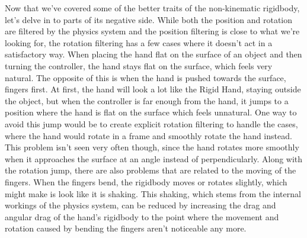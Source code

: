 Now that we've covered some of the better traits of the non-kinematic rigidbody, let's delve in to parts of its negative side. While both the position and rotation are filtered by the physics system and the position filtering is close to what we're looking for, the rotation filtering has a few cases where it doesn't act in a satisfactory way. When placing the hand flat on the surface of an object and then turning the controller, the hand stays flat on the surface, which feels very natural. The opposite of this is when the hand is pushed towards the surface, fingers first. At first, the hand will look a lot like the Rigid Hand, staying outside the object, but when the controller is far enough from the hand, it jumps to a position where the hand is flat on the surface which feels unnatural. One way to avoid this jump would be to create explicit rotation filtering to handle the cases, where the hand would rotate in a frame and smoothly rotate the hand instead. This problem isn't seen very often though, since the hand rotates more smoothly when it approaches the surface at an angle instead of perpendicularly. Along with the rotation jump, there are also problems that are related to the moving of the fingers. When the fingers bend, the rigidbody moves or rotates slightly, which might make is look like it is shaking. This shaking, which stems from the internal workings of the physics system, can be reduced by increasing the drag and angular drag of the hand's rigidbody to the point where the movement and rotation caused by bending the fingers aren't noticeable any more.

